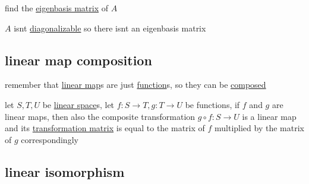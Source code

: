 \documentclass[a4paper,12pt]{article}
\begin{document}
\begin{definition}
\begin{question}
\begin{subquestion}
find the \hyperref[sec:org136aa39]{eigenbasis matrix} of \(A\)\\
\begin{answer}
\(A\) isnt \hyperref[sec:org136aa39]{diagonalizable} so there isnt an eigenbasis matrix\\
\end{answer}
\end{subquestion}
\end{question}
\end{definition}
\subsection{linear map composition}
\label{sec:org4ce1639}
remember that \hyperref[sec:orgdf3d063]{linear map}s are just \href{discrete_maths2.org}{function}s, so they can be \href{discrete_maths2.org}{composed}\\
\begin{characteristic}
let \(S,T,U\) be \hyperref[sec:orgea93933]{linear space}s, let \(f:S\to T, g:T\to U\) be functions, if \(f\) and \(g\) are linear maps, then also the composite transformation \(g\circ f:S\to U\) is a linear map and its \hyperref[sec:orgda83b79]{transformation matrix} is equal to the matrix of \(f\) multiplied by the matrix of \(g\) correspondingly \cite{statlect_linear_map_composition}\\
\end{characteristic}
\subsection{linear isomorphism}
\label{sec:orgb9fe876}
\end{document}
